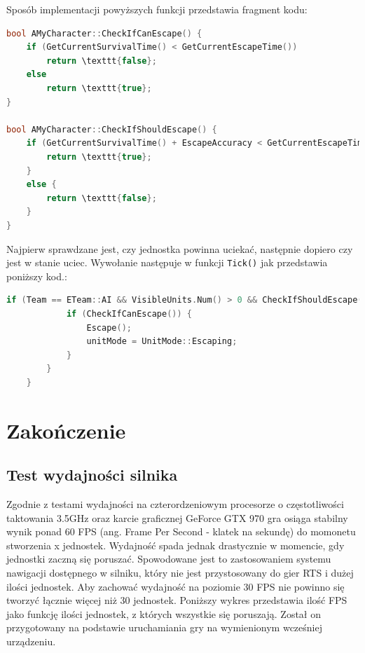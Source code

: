 \documentclass[12pt]{report}
\begin{document}
Sposób implementacji powyższych funkcji przedstawia fragment kodu:

\begin{lstlisting}[language=C++, backgroundcolor=\color{black!5}, basicstyle=\footnotesize, caption=Funkcje CheckIfShouldEscape i CheckIfCanEscape w klasie \texttt{AMyCharacter.cpp}.]
    bool AMyCharacter::CheckIfCanEscape() {
	if (GetCurrentSurvivalTime() < GetCurrentEscapeTime())
		return \texttt{false};
	else
		return \texttt{true};
}

bool AMyCharacter::CheckIfShouldEscape() {
	if (GetCurrentSurvivalTime() + EscapeAccuracy < GetCurrentEscapeTime()) {
		return \texttt{true};
	}
	else {
		return \texttt{false};
	}
}
\end{lstlisting}

Najpierw sprawdzane jest, czy jednostka powinna uciekać, następnie dopiero czy jest w stanie uciec. Wywołanie następuje w funkcji \texttt{\texttt{Tick}()} jak przedstawia poniższy kod.:

\begin{lstlisting}[language=C++, backgroundcolor=\color{black!5}, basicstyle=\footnotesize, caption=Wywołanie funkcji CheckIfShouldEscape i CheckIfCanEscape w funkcji \texttt{\texttt{Tick}()} klasy AMyCharacter.]
if (Team == ETeam::AI && VisibleUnits.Num() > 0 && CheckIfShouldEscape() ) {
			if (CheckIfCanEscape()) {
				Escape();
				unitMode = UnitMode::Escaping;
			}
		}
	}
\end{lstlisting}

\chapter{Zakończenie}
\section{Test wydajności silnika}

Zgodnie z testami wydajności na czterordzeniowym procesorze o częstotliwości taktowania 3.5GHz oraz karcie graficznej GeForce GTX 970 gra osiąga stabilny wynik ponad 60 FPS (ang. Frame Per Second - klatek na sekundę) do momonetu stworzenia x jednostek. Wydajność spada jednak drastycznie w momencie, gdy jednostki zaczną się poruszać. Spowodowane jest to zastosowaniem systemu nawigacji dostępnego w silniku, który nie jest przystosowany do gier RTS i dużej ilości jednostek. Aby zachować wydajność na poziomie 30 FPS nie powinno się tworzyć łącznie więcej niż 30 jednostek. Poniższy wykres przedstawia ilość FPS jako funkcję ilości jednostek, z których wszystkie się poruszają. Został on przygotowany na podstawie uruchamiania gry na wymienionym wcześniej urządzeniu. 
\end{document}

